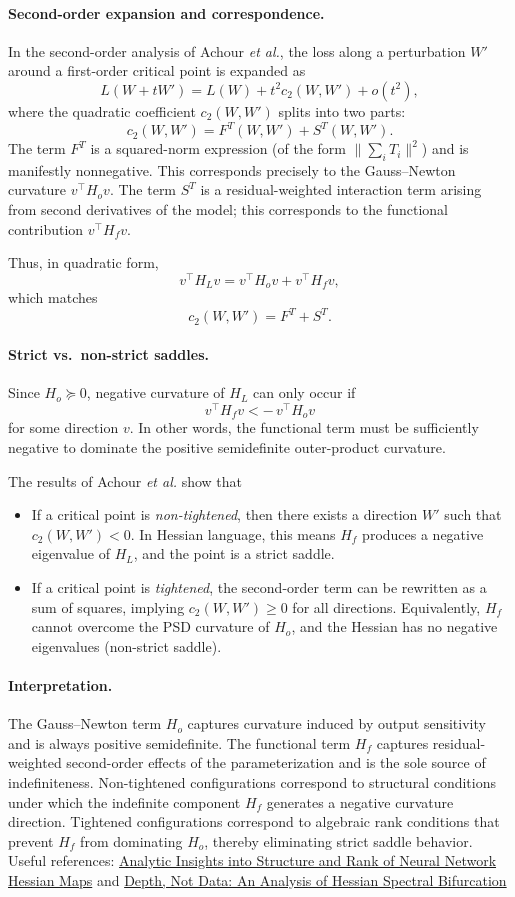 \documentclass{article}
\theoremstyle{definition}
\begin{document}
\paragraph{Second-order expansion and correspondence.}
In the second-order analysis of Achour \emph{et al.}, the loss along a perturbation $W'$
around a first-order critical point is expanded as
\[
L(W + tW') = L(W) + t^2 c_2(W,W') + o(t^2),
\]
where the quadratic coefficient $c_2(W,W')$ splits into two parts:
\[
c_2(W,W') = F^T(W,W') + S^T(W,W').
\]
The term $F^T$ is a squared-norm expression (of the form
$\|\sum_i T_i\|^2$) and is manifestly nonnegative.
This corresponds precisely to the Gauss--Newton curvature $v^\top H_o v$.
The term $S^T$ is a residual-weighted interaction term arising from
second derivatives of the model; this corresponds to the functional contribution
$v^\top H_f v$.

Thus, in quadratic form,
\[
v^\top H_L v
=
v^\top H_o v
+
v^\top H_f v,
\]
which matches
\[
c_2(W,W') = F^T + S^T.
\]

\paragraph{Strict vs.\ non-strict saddles.}
Since $H_o \succeq 0$, negative curvature of $H_L$ can only occur if
\[
v^\top H_f v < -\, v^\top H_o v
\]
for some direction $v$.
In other words, the functional term must be sufficiently negative
to dominate the positive semidefinite outer-product curvature.

The results of Achour \emph{et al.} show that
\begin{itemize}
\item If a critical point is \emph{non-tightened}, then there exists a direction
$W'$ such that $c_2(W,W') < 0$.
In Hessian language, this means $H_f$ produces a negative eigenvalue of
$H_L$, and the point is a strict saddle.
\item If a critical point is \emph{tightened}, the second-order term can be
rewritten as a sum of squares, implying $c_2(W,W') \ge 0$ for all directions.
Equivalently, $H_f$ cannot overcome the PSD curvature of $H_o$,
and the Hessian has no negative eigenvalues (non-strict saddle).
\end{itemize}

\paragraph{Interpretation.}
The Gauss--Newton term $H_o$ captures curvature induced by output sensitivity
and is always positive semidefinite.
The functional term $H_f$ captures residual-weighted second-order effects
of the parameterization and is the sole source of indefiniteness.
Non-tightened configurations correspond to structural conditions under which
the indefinite component $H_f$ generates a negative curvature direction.
Tightened configurations correspond to algebraic rank conditions that prevent
$H_f$ from dominating $H_o$, thereby eliminating strict saddle behavior. 
\\
Useful references: \href{https://arxiv.org/abs/2106.16225}{Analytic Insights into Structure and Rank of
Neural Network Hessian Maps} and \href{https://arxiv.org/abs/2602.00545}{Depth, Not Data: An Analysis of Hessian Spectral Bifurcation
}
\end{document}
